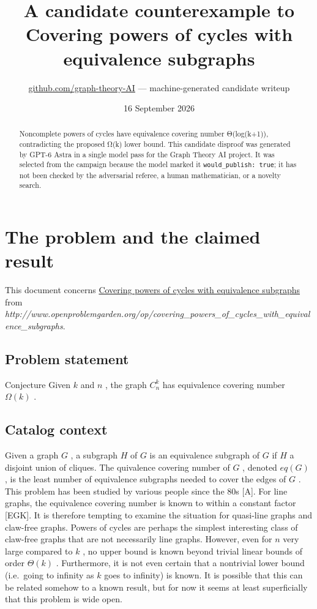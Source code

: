 \documentclass[
  11pt,
  a4paper,
]{article}
\title{A candidate counterexample to Covering powers of cycles with
equivalence subgraphs}
\author{\href{https://github.com/graph-theory-AI}{github.com/graph-theory-AI}
--- machine-generated candidate writeup}
\date{16 September 2026}
\begin{document}
\maketitle
\begin{abstract}
Noncomplete powers of cycles have equivalence covering number
Θ(log(k+1)), contradicting the proposed Ω(k) lower bound. This candidate
disproof was generated by GPT-6 Astra in a single model pass for the
Graph Theory AI project. It was selected from the campaign because the
model marked it \texttt{would\_publish:\ true}; it has not been checked
by the adversarial referee, a human mathematician, or a novelty search.
\end{abstract}

\section{The problem and the claimed
result}\label{the-problem-and-the-claimed-result}

This document concerns
\href{https://graph-theory-ai.github.io/graph-conjectures/op/covering_powers_of_cycles_with_equivalence_subgraphs/}{Covering
powers of cycles with equivalence subgraphs} from
\emph{http://www.openproblemgarden.org/op/covering\_powers\_of\_cycles\_with\_equivalence\_subgraphs}.

\subsection{Problem statement}\label{problem-statement}

Conjecture Given \(k\) and \(n\) , the graph \(C_{n}^k\) has equivalence
covering number \(\Omega(k)\) .

\subsection{Catalog context}\label{catalog-context}

Given a graph \(G\) , a subgraph \(H\) of \(G\) is an equivalence
subgraph of \(G\) if \(H\) a disjoint union of cliques. The quivalence
covering number of \(G\) , denoted \(eq(G)\) , is the least number of
equivalence subgraphs needed to cover the edges of \(G\) . This problem
has been studied by various people since the 80s {[}A{]}. For line
graphs, the equivalence covering number is known to within a constant
factor {[}EGK{]}. It is therefore tempting to examine the situation for
quasi-line graphs and claw-free graphs. Powers of cycles are perhaps the
simplest interesting class of claw-free graphs that are not necessarily
line graphs. However, even for \(n\) very large compared to \(k\) , no
upper bound is known beyond trivial linear bounds of order \(\Theta(k)\)
. Furthermore, it is not even certain that a nontrivial lower bound
(i.e.~going to infinity as \(k\) goes to infinity) is known. It is
possible that this can be related somehow to a known result, but for now
it seems at least superficially that this problem is wide open.
\end{document}

